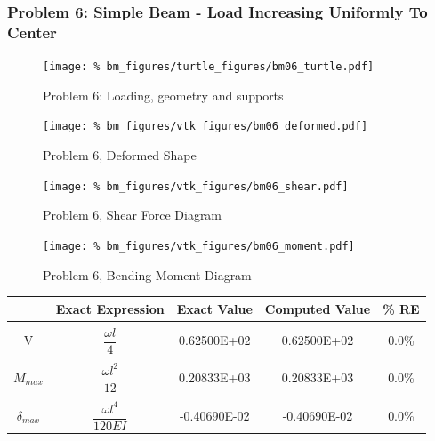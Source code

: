 \subsubsection{Problem 6: Simple Beam - Load Increasing Uniformly To Center}
\begin{figure}[h]
    \texttt{[image: \%
                            bm\_figures/turtle\_figures/bm06\_turtle.pdf]}
    \centering
    \caption{Problem 6: Loading, geometry and supports}
    \label{fig:bm06_turtle}
\end{figure}


\begin{figure}[!htb]
    \texttt{[image: \%
                     bm\_figures/vtk\_figures/bm06\_deformed.pdf]}
    \centering
    \caption{Problem 6, Deformed Shape}
    \label{fig:bm06_deformed}
\end{figure}
\begin{figure}[!htb]
    \texttt{[image: \%
                     bm\_figures/vtk\_figures/bm06\_shear.pdf]}
    \centering
    \caption{Problem 6, Shear Force Diagram}
    \label{fig:bm06_shear}
\end{figure}
\begin{figure}[!htb]
    \texttt{[image: \%
                     bm\_figures/vtk\_figures/bm06\_moment.pdf]}
    \centering
    \caption{Problem 6, Bending Moment Diagram}
    \label{fig:bm06_moment}
\end{figure}
\begin{table}[h!]
\centering
\begin{tabular}{ c| c c c c }
    & Exact Expression & Exact Value & Computed Value & \% RE \\ \hline \\
    V   & $\dfrac{\omega l}{4}$ &  0.62500E+02 & 0.62500E+02 & 0.0\% \\ \\
    $M_{max}$ & $\dfrac{\omega l^2}{12}$ & 0.20833E+03 & 0.20833E+03 & 0.0\% \\ \\
    $\delta_{max}$ & $\dfrac{\omega l^4}{120EI}$ & -0.40690E-02 & -0.40690E-02 & 0.0\% \\
\end{tabular}
\end{table}

%
%

\clearpage
